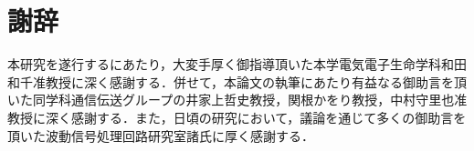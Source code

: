 \chapter*{謝辞}
本研究を遂行するにあたり，大変手厚く御指導頂いた本学電気電子生命学科和田和千准教授に深く感謝する．併せて，本論文の執筆にあたり有益なる御助言を頂いた同学科通信伝送グループの井家上哲史教授，関根かをり教授，中村守里也准教授に深く感謝する．また，日頃の研究において，議論を通じて多くの御助言を頂いた波動信号処理回路研究室諸氏に厚く感謝する．

\makesignature
